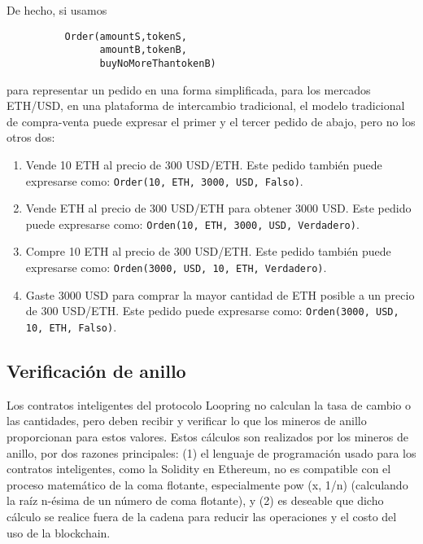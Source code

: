 \documentclass[UTF8,nofonts]{article}
\begin{document}
\begin{multicols}{2}
De hecho, si usamos


\begin{verbatim}
	      Order(amountS,tokenS,
	            amountB,tokenB,
	            buyNoMoreThantokenB)
\end{verbatim}

para representar un pedido en una forma simplificada, para los mercados ETH/USD, en una plataforma de intercambio tradicional, el modelo tradicional de compra-venta puede expresar el primer y el tercer pedido de abajo, pero no los otros dos:

\begin{enumerate}
	\item Vende 10 ETH al precio de 300 USD/ETH. Este pedido tambi\'en puede expresarse como: \verb|Order(10, ETH, 3000, USD, Falso)|.
	\item Vende ETH al precio de 300 USD/ETH para obtener 3000 USD. Este pedido puede expresarse como: \verb|Orden(10, ETH, 3000, USD, Verdadero)|.
	\item Compre 10 ETH al precio de 300 USD/ETH. Este pedido tambi\'en puede expresarse como: \verb|Orden(3000, USD, 10, ETH, Verdadero)|.
	\item Gaste 3000 USD para comprar la mayor cantidad de ETH posible a un precio de 300 USD/ETH. Este pedido puede expresarse como: \verb|Orden(3000, USD, 10, ETH, Falso)|.
\end{enumerate}

\subsection{Verificaci\'on de anillo\label{sec:ring_verification}}
Los contratos inteligentes del protocolo Loopring no calculan la tasa de cambio o las cantidades, pero deben recibir y verificar lo que los mineros de anillo proporcionan para estos valores. Estos c\'alculos son realizados por los mineros de anillo, por dos razones principales: (1) el lenguaje de programaci\'on usado para los contratos inteligentes, como la Solidity  \cite{dannen2017introducing} en Ethereum, no es compatible con el proceso matem\'atico de la coma flotante, especialmente pow (x, 1/n) (calculando la ra\'iz n-\'esima de un n\'umero de coma flotante), y (2) es deseable que dicho c\'alculo se realice fuera de la cadena para reducir las operaciones y el costo del uso de la blockchain.



\end{multicols}
\end{document}
